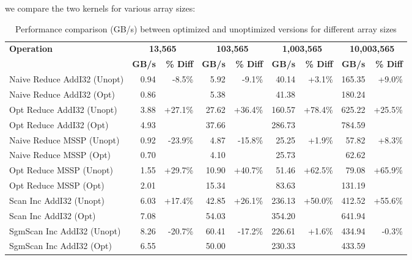 \documentclass{article}
\begin{document}
we compare the two kernels for various array sizes:

\begin{table}[h]
  \centering
  \small
  \begin{tabular}{|l|r|r|r|r|r|r|r|r|}
  \hline
  \multirow{2}{*}{\textbf{Operation}} & \multicolumn{2}{c|}{\textbf{13,565}} & \multicolumn{2}{c|}{\textbf{103,565}} & \multicolumn{2}{c|}{\textbf{1,003,565}} & \multicolumn{2}{c|}{\textbf{10,003,565}} \\
  \cline{2-9}
   & \textbf{GB/s} & \textbf{\% Diff} & \textbf{GB/s} & \textbf{\% Diff} & \textbf{GB/s} & \textbf{\% Diff} & \textbf{GB/s} & \textbf{\% Diff} \\
  \hline
  Naive Reduce AddI32 (Unopt) & 0.94 & \multirow{2}{*}{-8.5\%} & 5.92 & \multirow{2}{*}{-9.1\%} & 40.14 & \multirow{2}{*}{+3.1\%} & 165.35 & \multirow{2}{*}{+9.0\%} \\
  Naive Reduce AddI32 (Opt) & 0.86 & & 5.38 & & 41.38 & & 180.24 & \\
  \hline
  Opt Reduce AddI32 (Unopt) & 3.88 & \multirow{2}{*}{+27.1\%} & 27.62 & \multirow{2}{*}{+36.4\%} & 160.57 & \multirow{2}{*}{+78.4\%} & 625.22 & \multirow{2}{*}{+25.5\%} \\
  Opt Reduce AddI32 (Opt) & 4.93 & & 37.66 & & 286.73 & & 784.59 & \\
  \hline
  Naive Reduce MSSP (Unopt) & 0.92 & \multirow{2}{*}{-23.9\%} & 4.87 & \multirow{2}{*}{-15.8\%} & 25.25 & \multirow{2}{*}{+1.9\%} & 57.82 & \multirow{2}{*}{+8.3\%} \\
  Naive Reduce MSSP (Opt) & 0.70 & & 4.10 & & 25.73 & & 62.62 & \\
  \hline
  Opt Reduce MSSP (Unopt) & 1.55 & \multirow{2}{*}{+29.7\%} & 10.90 & \multirow{2}{*}{+40.7\%} & 51.46 & \multirow{2}{*}{+62.5\%} & 79.08 & \multirow{2}{*}{+65.9\%} \\
  Opt Reduce MSSP (Opt) & 2.01 & & 15.34 & & 83.63 & & 131.19 & \\
  \hline
  Scan Inc AddI32 (Unopt) & 6.03 & \multirow{2}{*}{+17.4\%} & 42.85 & \multirow{2}{*}{+26.1\%} & 236.13 & \multirow{2}{*}{+50.0\%} & 412.52 & \multirow{2}{*}{+55.6\%} \\
  Scan Inc AddI32 (Opt) & 7.08 & & 54.03 & & 354.20 & & 641.94 & \\
  \hline
  SgmScan Inc AddI32 (Unopt) & 8.26 & \multirow{2}{*}{-20.7\%} & 60.41 & \multirow{2}{*}{-17.2\%} & 226.61 & \multirow{2}{*}{+1.6\%} & 434.94 & \multirow{2}{*}{-0.3\%} \\
  SgmScan Inc AddI32 (Opt) & 6.55 & & 50.00 & & 230.33 & & 433.59 & \\
  \hline
  \end{tabular}
  \caption{Performance comparison (GB/s) between optimized and unoptimized versions for different array sizes}
  \label{tab:performance_comparison}
  \end{table}
\end{document}
